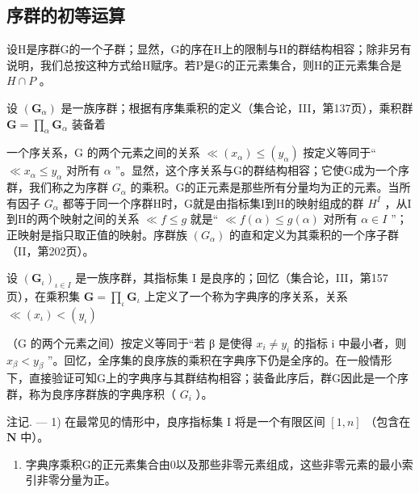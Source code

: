 \subsection{序群的初等运算}

设H是序群G的一个子群；显然，G的序在H上的限制与H的群结构相容；除非另有说明，我们总按这种方式给H赋序。若P是G的正元素集合，则H的正元素集合是 \(H \cap P\) 。

设 \((\mathbf{G}_{\alpha})\) 是一族序群；根据有序集乘积的定义（集合论，III，第137页），乘积群 \(\mathbf{G} = \prod_{\alpha}\mathbf{G}_{\alpha}\) 装备着

一个序关系，G 的两个元素之间的关系 \(\ll (x_{\alpha}) \leqslant (y_{\alpha})\) 按定义等同于“ \(\ll x_{\alpha} \leqslant y_{\alpha}\) 对所有 \(\alpha\) ”。显然，这个序关系与G的群结构相容；它使G成为一个序群，我们称之为序群 \(G_{\alpha}\) 的乘积。G的正元素是那些所有分量均为正的元素。当所有因子 \(G_{\alpha}\) 都等于同一个序群H时，G就是由指标集I到H的映射组成的群 \(H^{I}\) ，从I到H的两个映射之间的关系 \(\ll f \leqslant g\) 就是“ \(\ll f(\alpha) \leqslant g(\alpha)\) 对所有 \(\alpha \in I\) ”；正映射是指只取正值的映射。序群族 \((G_{\alpha})\) 的直和定义为其乘积的一个序子群（II，第202页）。

设 \((\mathbf{G}_{\iota})_{\iota \in I}\) 是一族序群，其指标集 I 是良序的；回忆（集合论，III，第157页），在乘积集 \(\mathbf{G} = \prod_{\iota} \mathbf{G}_{\iota}\) 上定义了一个称为字典序的序关系，关系 \(\ll (x_{\iota}) < (y_{\iota})\)

（G 的两个元素之间）按定义等同于“若 β 是使得 \(x_{i} \neq y_{i}\) 的指标 i 中最小者，则 \(x_{\beta} < y_{\beta}\) ”。回忆，全序集的良序族的乘积在字典序下仍是全序的。在一般情形下，直接验证可知G上的字典序与其群结构相容；装备此序后，群G因此是一个序群，称为良序序群族的字典序积（ \(G_{i}\) ）。

注记. --- 1) 在最常见的情形中，良序指标集 I 将是一个有限区间 \([1, n]\) （包含在 \(\mathbf{N}\) 中）。

\begin{enumerate}
\def\labelenumi{\arabic{enumi})}
\setcounter{enumi}{1}
\tightlist
\item
  字典序乘积G的正元素集合由0以及那些非零元素组成，这些非零元素的最小索引非零分量为正。
\end{enumerate}

